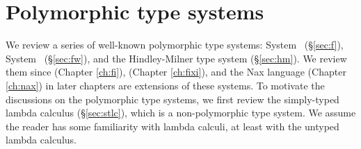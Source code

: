 \chapter{Polymorphic type systems}\label{ch:poly}
We review a series of well-known polymorphic type systems:
System \F\ (\S\ref{sec:f}), System \Fw\ (\S\ref{sec:fw}),
and the Hindley-Milner type system (\S\ref{sec:hm}).
We review them since \Fi (Chapter \ref{ch:fi}), \Fixi (Chapter \ref{ch:fixi}),
and the Nax language (Chapter \ref{ch:nax}) in later chapters are
extensions of these systems.
To motivate the discussions on the polymorphic type systems,
we first review the simply-typed lambda calculus (\S\ref{sec:stlc}),
which is a non-polymorphic type system. We assume the reader has some
familiarity with lambda calculi, at least with the untyped lambda calculus.



